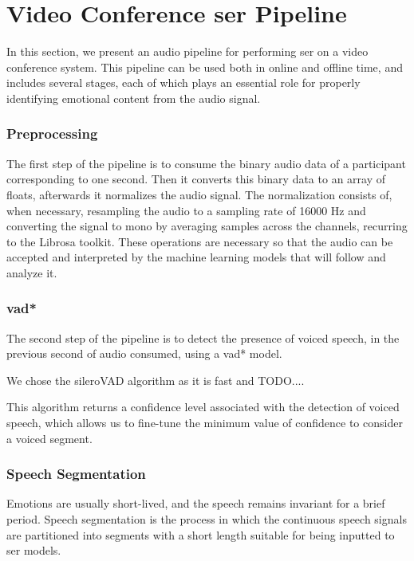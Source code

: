 \chapter{Video Conference \acl{ser} Pipeline}
\label{chapter:ser_conf}

In this section, we present an audio pipeline for performing \ac{ser} on a video conference system. This pipeline can be used both in online and offline time, and includes several stages, each of which plays an essential role for properly identifying emotional content from the audio signal.

\subsection{Preprocessing}

The first step of the pipeline is to consume the binary audio data of a participant corresponding to one second. Then it converts this binary data to an array of floats, afterwards it normalizes the audio signal. The normalization consists of, when necessary, resampling the audio to a sampling rate of 16000 Hz and converting the signal to mono by averaging samples across the channels, recurring to the Librosa toolkit. These operations are necessary so that the audio can be accepted and interpreted by the machine learning models that will follow and analyze it.

\subsection{\acl{vad*}}

The second step of the pipeline is to detect the presence of voiced speech, in the previous second of audio consumed, using a \ac{vad*} model.

We chose the sileroVAD algorithm as it is fast and TODO....

This algorithm returns a confidence level associated with the detection of voiced speech, which allows us to fine-tune the minimum value of confidence to consider a voiced segment.

\subsection{Speech Segmentation}


Emotions are usually short-lived, and the speech remains invariant for a brief period. Speech segmentation is the process in which the continuous speech signals are partitioned into segments with a short length suitable for being inputted to \ac{ser} models.

